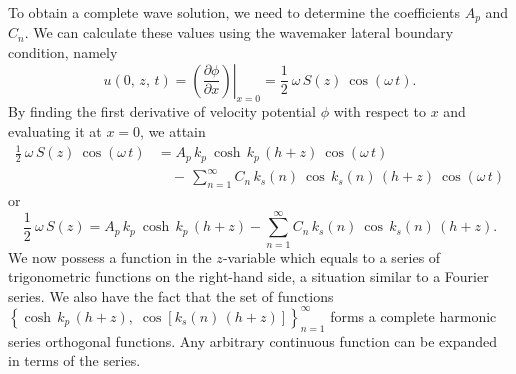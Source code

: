 \documentclass[12pt,a4paper]{report}
\begin{document}
To obtain a complete wave solution, we need to determine the coefficients $A_{p}$ and $C_{n}$. We can calculate these values using the wavemaker lateral boundary condition, namely
\begin{equation}
u(0,\,z,\,t) = \left. \left(\frac{\partial \phi}{\partial x} \right) \right|_{x = 0} = \frac{1}{2} \: \omega \, S(z) \: \cos (\omega\,t).
\end{equation}
By finding the first derivative of velocity potential $\phi$ with respect to $x$ and evaluating it at $x = 0$, we attain
\begin{align}
\frac{1}{2} \: \omega \,S(z) \: \cos (\omega\,t) &= A_{p} \, k_{p} \: \cosh \, k_{p}\,(h + z) \: \cos (\omega\,t) \nonumber \\
& \quad - \, \sum_{n = 1}^{\infty} C_{n} \, k_{s}(n) \: \cos \, k_{s}(n) \,(h + z) \: \cos (\omega \,t)
\end{align}
or
\begin{equation}
\frac{1}{2} \: \omega \, S(z) = A_{p} \, k_{p} \: \cosh \, k_{p}\,(h + z) - \sum_{n = 1}^{\infty} C_{n} \, k_{s}(n) \: \cos \, k_{s}(n) \,(h + z).  \label{fourier}
\end{equation}
We now possess a function in the $z$-variable which equals to a series of trigonometric functions on the right-hand side, a situation similar to a Fourier series.
We also have the fact that the set of functions $\left\{ \cosh \,k_{p}\,(h + z), \; \cos \left[ k_{s}(n)\,(h + z) \right] \right \}_{n = 1}^{\infty}$ forms a complete harmonic series orthogonal functions. Any arbitrary continuous function can be expanded in terms of the series.
\end{document}
